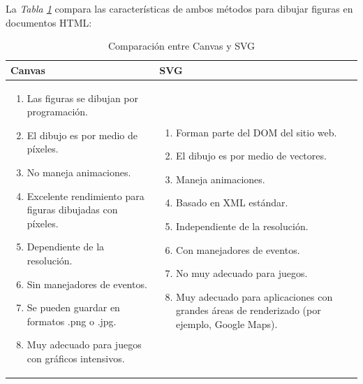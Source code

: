 La \textit{Tabla \ref{tab: 1}} compara las características de ambos métodos para dibujar figuras en documentos HTML:
\begin{table}[H]
    \begin{center}
        \caption{Comparación entre Canvas y SVG}
        \label{tab: 1}
        \begin{tabular}{m{7cm} m{7cm}}
            \hline
            \textbf{Canvas} & \textbf{SVG} \\
            \hline
            \begin{enumerate}
                \item Las figuras se dibujan por programación.
                \item El dibujo es por medio de píxeles.
                \item No maneja animaciones.
                \item Excelente rendimiento para figuras dibujadas con píxeles.
                \item Dependiente de la resolución.
                \item Sin manejadores de eventos.
                \item Se pueden guardar en formatos .png o .jpg.
                \item Muy adecuado para juegos con gráficos intensivos.
            \end{enumerate}
            &
            \begin{enumerate}
                \item Forman parte del DOM del sitio web.
                \item El dibujo es por medio de vectores.
                \item Maneja animaciones.
                \item Basado en XML estándar.
                \item Independiente de la resolución.
                \item Con manejadores de eventos.
                \item No muy adecuado para juegos.
                \item Muy adecuado para aplicaciones con grandes áreas de renderizado (por ejemplo, Google Maps).
            \end{enumerate}
            \\
            \hline
        \end{tabular}
    \end{center}
\end{table}


